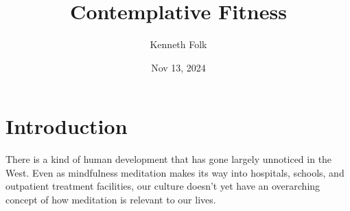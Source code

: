 \documentclass[a5paper,10pt,english]{book}
\title{Contemplative Fitness}
\date{Nov 13, 2024}
\author{Kenneth Folk}
\renewcommand{\releasename}{e175053}
\begin{document}
\pagestyle{empty}

\makeatletter%
%
\makeatother%

\pagestyle{plain}
\sphinxtableofcontents
\pagestyle{normal}
\label{\detokenize{index::doc}}


\frontmatter
\bgroup
\def\thesection{\arabic{section} }

\sphinxstepscope


\chapter{Introduction}
\label{\detokenize{front-intro:introduction}}\label{\detokenize{front-intro::doc}}
\setcounter{section}{0}

\sphinxAtStartPar
There is a kind of human development that has gone largely unnoticed in
the West. Even as mindfulness meditation makes its way into hospitals,
schools, and outpatient treatment facilities, our culture doesn’t yet
have an over\sphinxhyphen{}arching concept of how meditation is relevant to our lives.
\end{document}
